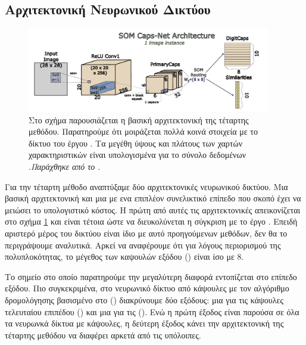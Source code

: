 \subsection{Αρχιτεκτονική Νευρωνικού Δικτύου}

\begin{figure}[h]
  \centering
  \includegraphics[width=0.95\textwidth]{images/chapter method/forth_method_architecture.pdf}
  \caption{Στο σχήμα παρουσιάζεται η βασική αρχιτεκτονική της τέταρτης μεθόδου. Παρατηρούμε ότι μοιράζεται πολλά κοινά στοιχεία με το δίκτυο του έργου \cite{sabour2017dynamic}. Τα μεγέθη ύψους και πλάτους των χαρτών χαρακτηριστικών είναι υπολογισμένα για το σύνολο δεδομένων .\textit{Παράχθηκε από το \href{https://inkscape.org/}{}}.}
  \label{fig:method_4_architecture}
\end{figure}

Για την τέταρτη μέθοδο αναπτύξαμε δύο αρχιτεκτονικές νευρωνικού δικτύου. Μια βασική αρχιτεκτονική και μια με ενα επιπλέον συνελικτικό επίπεδο που σκοπό έχει να μειώσει το υπολογιστικό κόστος. Η πρώτη από αυτές τις αρχιτεκτονικές απεικονίζεται στο σχήμα \ref{fig:method_4_architecture} και είναι τέτοια ώστε να διευκολύνεται η σύγκριση με το έργο \cite{sabour2017dynamic}. Επειδή αριστερό μέρος του δικτύου είναι ίδιο με αυτό προηγούμενων μεθόδων, δεν θα το περιγράψουμε αναλυτικά. Αρκεί να αναφέρουμε ότι για λόγους περιορισμού της πολυπλοκότητας, το μέγεθος των καψουλών εξόδου () είναι ίσο με 8.

Το σημείο στο οποίο παρατηρούμε την μεγαλύτερη διαφορά εντοπίζεται στο επίπεδο εξόδου. Πιο συγκεκριμένα, στο νευρωνικό δίκτυο από κάψουλες με τον αλγόριθμο δρομολόγησης βασισμένο στο  () διακρύνουμε δύο εξόδους: μια για τις κάψουλες τελευταίου επιπέδου () και μια για τις  (). Ενώ η πρώτη έξοδος είναι παρούσα σε όλα τα νευρωνκά δίκτυα με κάψουλες, η δεύτερη έξοδος κάνει την αρχιτεκτονική της τέταρτης μεθόδου να διαφέρει αρκετά από τις υπόλοιπες.\par

